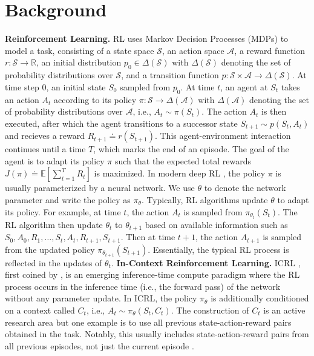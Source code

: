 \documentclass{article}
\newcommand{\E}{\mathbb{E}}
\newcommand{\R}{\mathbb{R}}
\newcommand{\fS}{\mathcal{S}}
\newcommand{\fA}{\mathcal{A}}
\newcommand{\0}{\mathbf{0}}
\begin{document}
\section{Background}
\textbf{Reinforcement Learning.}
RL uses Markov Decision Processes (MDPs) to model a task,
consisting of a state space $\fS$,
an action space $\fA$,
a reward function $r: \fS \to \R$,
an initial distribution $p_0 \in \Delta(\fS)$ with $\Delta(\fS)$ denoting the set of probability distributions over $\fS$,
and a transition function $p: \fS \times \fA \to \Delta(\fS)$.
At time step 0,
an initial state $S_0$ sampled from $p_0$.
At time $t$,
an agent at $S_t$ takes an action $A_t$ according to its policy $\pi: \fS \to \Delta(\fA)$ with $\Delta(\fA)$ denoting the set of probability distributions over $\fA$, i.e., $A_t \sim \pi(S_t)$.
The action $A_t$ is then executed,
after which the agent transitions to a successor state $S_{t+1} \sim p(S_t, A_t)$ and recieves a reward $R_{t+1} \doteq r(S_{t+1})$.
This agent-environment interaction continues until a time $T$,
which marks the end of an episode.
The goal of the agent is to adapt its policy $\pi$ such that the expected total rewards $J(\pi) \doteq \E[\sum_{t=1}^T R_t]$ is maximized.
In modern deep RL \citep{mnih2015human,schulman2017proximal},
the policy $\pi$ is usually parameterized by a neural network.
We use $\theta$ to denote the network parameter and write the policy as $\pi_\theta$.
Typically, RL algorithms update $\theta$ to adapt its policy.
For example, at time $t$,
the action $A_t$ is sampled from $\pi_{\theta_t}(S_t)$.
The RL algorithm then update $\theta_t$ to $\theta_{t+1}$ based on available information such as $S_0, A_0, R_1, \dots, S_t, A_t, R_{t+1}, S_{t+1}$.
Then at time $t+1$,
the action $A_{t+1}$ is sampled from the updated policy $\pi_{\theta_{t+1}}(S_{t+1})$.
Essentially, the typical RL process is reflected in the updates of ${\theta_t}$.
\textbf{In-Context Reinforcement Learning.} ICRL \citep{moeini2025survey}, first coined by \citet{laskin2023incontext}, is an emerging inference-time compute paradigm where the RL process occurs in the inference time (i.e., the forward pass) of the network without any parameter update.
In ICRL, the policy $\pi_\theta$ is additionally conditioned on a context called $C_t$, i.e., $A_t \sim \pi_\theta(S_t, C_t)$.
The construction of $C_t$ is an active research area but one example is to use all previous state-action-reward pairs obtained in the task.
Notably, this usually includes state-action-reward pairs from all previous episodes, not just the current episode \citep{laskin2023incontext}.
\end{document}
